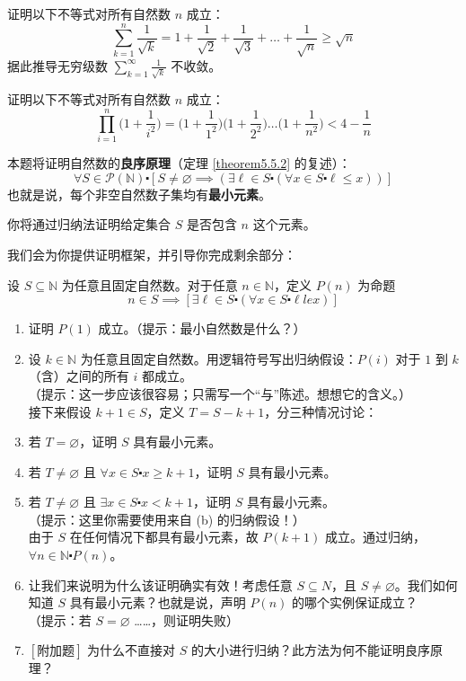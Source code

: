 \begin{exercise}
    证明以下不等式对所有自然数 $n$ 成立：
    \[\sum_{k=1}^{n} \frac{1}{\sqrt{k}} = 1+\frac{1}{\sqrt{2}}+\frac{1}{\sqrt{3}}+\dots+\frac{1}{\sqrt{n}} \ge \sqrt{n}\]
    据此推导无穷级数 $\displaystyle \sum_{k=1}^{\infty} \frac{1}{\sqrt{k}}$ 不收敛。
\end{exercise}

\begin{exercise}
    证明以下不等式对所有自然数 $n$ 成立：
    \[\prod_{i=1}^{n} \Big(1+\frac{1}{i^2}\Big) = \Big(1+\frac{1}{1^2}\Big)\Big(1+\frac{1}{2^2}\Big) \dots \Big(1+\frac{1}{n^2}\Big) < 4-\frac{1}{n}\]
\end{exercise}

\begin{exercise}\label{exc:exercises5.7.21}
    本题将证明自然数的\textbf{良序原理}（定理 \ref{theorem5.5.2} 的复述）：
    \[\forall S \in \mathcal{P}(\mathbb{N}) \centerdot [S \ne \varnothing \implies (\exists \ell \in S \centerdot (\forall x \in S \centerdot \ell \le x))]\]
    也就是说，每个非空自然数子集均有\textbf{最小元素}。

    你将通过归纳法证明给定集合 $S$ 是否包含 $n$ 这个元素。

    我们会为你提供证明框架，并引导你完成剩余部分：

    设 $S \subseteq \mathbb{N}$ 为任意且固定自然数。对于任意 $n \in \mathbb{N}$，定义 $P(n)$ 为命题
    \[n \in S \implies [\exists \ell \in S \centerdot (\forall x \in S \centerdot \ell le x)]\]
    \begin{enumerate}[label=(\alph*)]
        \item 证明 $P(1)$ 成立。（提示：最小自然数是什么？）
        \item 设 $k \in \mathbb{N}$ 为任意且固定自然数。用逻辑符号写出归纳假设：$P(i)$ 对于 $1$ 到 $k$（含）之间的所有 $i$ 都成立。 \\
        （提示：这一步应该很容易；只需写一个``与''陈述。想想它的含义。）\\
        接下来假设 $k + 1 \in S$，定义 $T = S - {k + 1}$，分三种情况讨论：
        \item 若 $T = \varnothing$，证明 $S$ 具有最小元素。
        \item 若 $T \ne \varnothing$ 且 $\forall x \in S \centerdot x \ge k + 1$，证明 $S$ 具有最小元素。
        \item 若 $T \ne \varnothing$ 且 $\exists x \in S \centerdot x < k + 1$，证明 $S$ 具有最小元素。\\
        （提示：这里你需要使用来自 (b) 的归纳假设！）\\
        由于 $S$ 在任何情况下都具有最小元素，故 $P(k + 1)$ 成立。通过归纳，$\forall n \in \mathbb{N} \centerdot P(n)$。
        \item 让我们来说明为什么该证明确实有效！考虑任意 $S \subseteq N$，且 $S \ne \varnothing$。我们如何知道 $S$ 具有最小元素？也就是说，声明 $P(n)$ 的哪个实例保证成立？\\
        （提示：若 $S = \varnothing$ ……，则证明失败）
        \item $[\text{附加题}]$ 为什么不直接对 $S$ 的大小进行归纳？此方法为何不能证明良序原理？
    \end{enumerate}
\end{exercise}

